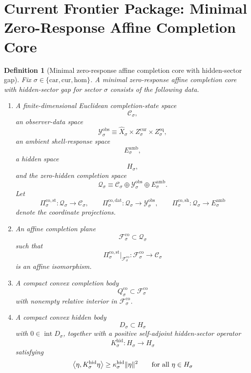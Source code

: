 \documentclass[11pt]{article}
\newcommand{\Car}{\mathrm{car}}
\newcommand{\Cur}{\mathrm{cur}}
\newcommand{\Hom}{\mathrm{hom}}
\newcommand{\VisibleAffine}[1]{\widehat X_{#1}}
\newcommand{\DataSpace}[1]{\mathcal Y_{#1}^{\mathrm{obs}}}
\newcommand{\AmbientTarget}[1]{E_{#1}^{\mathrm{amb}}}
\newcommand{\CoreState}[1]{\mathcal C_{#1}}
\newcommand{\CoreSpace}[1]{\mathcal Q_{#1}}
\newcommand{\CoreAffine}[1]{\mathcal F_{#1}^{\mathrm{co}}}
\newcommand{\CoreBody}[1]{Q_{#1}^{\mathrm{co}}}
\newcommand{\CoreStateProj}[1]{\Pi_{#1}^{\mathrm{co,st}}}
\newcommand{\CoreDataProj}[1]{\Pi_{#1}^{\mathrm{co,dat}}}
\newcommand{\CoreShellProj}[1]{\Pi_{#1}^{\mathrm{co,sh}}}
\newcommand{\GapSpace}[1]{H_{#1}}
\newcommand{\GapBody}[1]{D_{#1}}
\newcommand{\HiddenOperator}[1]{K_{#1}^{\mathrm{hid}}}
\newtheorem{definition}{Definition}
\begin{document}
\section{Current Frontier Package: Minimal Zero-Response Affine Completion Core}

\begin{definition}[Minimal zero-response affine completion core with hidden-sector gap]
\label{def:core}
Fix \(\sigma\in\{\Car,\Cur,\Hom\}\). A \emph{minimal zero-response affine completion core with hidden-sector gap} for sector \(\sigma\) consists of the following data.
\begin{enumerate}
    \item A finite-dimensional Euclidean completion-state space
    \[
    \CoreState{\sigma},
    \]
    an observer-data space
    \[
    \DataSpace{\sigma}
    \equiv
    \VisibleAffine{\sigma}\times Z_{\sigma}^{\mathrm{cur}}\times Z_{\sigma}^{\mathrm{eq}},
    \]
    an ambient shell-response space
    \[
    \AmbientTarget{\sigma},
    \]
    a hidden space
    \[
    \GapSpace{\sigma},
    \]
    and the zero-hidden completion space
    \[
    \CoreSpace{\sigma}
    \equiv
    \CoreState{\sigma}\oplus\DataSpace{\sigma}\oplus\AmbientTarget{\sigma}.
    \]
    Let
    \[
    \CoreStateProj{\sigma}:\CoreSpace{\sigma}\to\CoreState{\sigma},
    \qquad
    \CoreDataProj{\sigma}:\CoreSpace{\sigma}\to\DataSpace{\sigma},
    \qquad
    \CoreShellProj{\sigma}:\CoreSpace{\sigma}\to\AmbientTarget{\sigma}
    \]
    denote the coordinate projections.
    \item An affine completion plane
    \[
    \CoreAffine{\sigma}\subset\CoreSpace{\sigma}
    \]
    such that
    \[
    \CoreStateProj{\sigma}\big|_{\CoreAffine{\sigma}}:
    \CoreAffine{\sigma}\to\CoreState{\sigma}
    \]
    is an affine isomorphism.
    \item A compact convex completion body
    \[
    \CoreBody{\sigma}\subset\CoreAffine{\sigma}
    \]
    with nonempty relative interior in \(\CoreAffine{\sigma}\).
    \item A compact convex hidden body
    \[
    \GapBody{\sigma}\subset\GapSpace{\sigma}
    \]
    with \(0\in\operatorname{int}\GapBody{\sigma}\), together with a positive self-adjoint hidden-sector operator
    \[
    \HiddenOperator{\sigma}:\GapSpace{\sigma}\to\GapSpace{\sigma}
    \]
    satisfying
    \begin{equation}
    \ev{\eta,\HiddenOperator{\sigma}\eta}
    \ge
    \kappa_{\sigma}^{\mathrm{hid}}\|\eta\|^{2}
    \qquad
    \text{for all }\eta\in\GapSpace{\sigma}

\end{equation}
\end{enumerate}
\end{definition}
\end{document}
